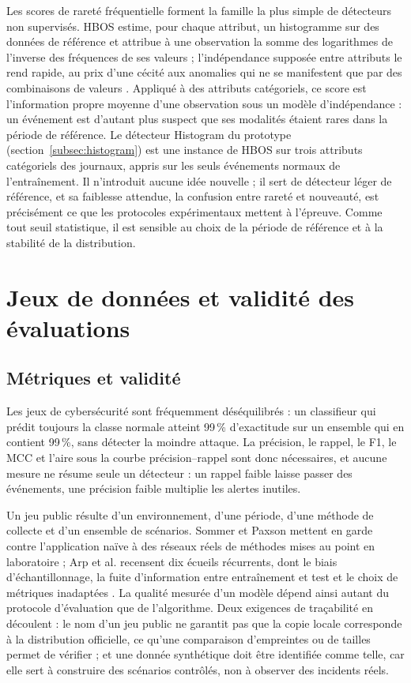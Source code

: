 Les scores de rareté fréquentielle forment la famille la plus simple de détecteurs non supervisés. HBOS estime, pour chaque attribut, un histogramme sur des données de référence et attribue à une observation la somme des logarithmes de l'inverse des fréquences de ses valeurs ; l'indépendance supposée entre attributs le rend rapide, au prix d'une cécité aux anomalies qui ne se manifestent que par des combinaisons de valeurs \cite{goldstein2012hbos}. Appliqué à des attributs catégoriels, ce score est l'information propre moyenne d'une observation sous un modèle d'indépendance : un événement est d'autant plus suspect que ses modalités étaient rares dans la période de référence. Le détecteur Histogram du prototype (section~\ref{subsec:histogram}) est une instance de HBOS sur trois attributs catégoriels des journaux, appris sur les seuls événements normaux de l'entraînement. Il n'introduit aucune idée nouvelle ; il sert de détecteur léger de référence, et sa faiblesse attendue, la confusion entre rareté et nouveauté, est précisément ce que les protocoles expérimentaux mettent à l'épreuve. Comme tout seuil statistique, il est sensible au choix de la période de référence et à la stabilité de la distribution.

\section{Jeux de données et validité des évaluations}

\subsection{Métriques et validité}

Les jeux de cybersécurité sont fréquemment déséquilibrés : un classifieur qui prédit toujours la classe normale atteint 99\,\% d'exactitude sur un ensemble qui en contient 99\,\%, sans détecter la moindre attaque. La précision, le rappel, le F1, le MCC et l'aire sous la courbe précision--rappel sont donc nécessaires, et aucune mesure ne résume seule un détecteur : un rappel faible laisse passer des événements, une précision faible multiplie les alertes inutiles.

Un jeu public résulte d'un environnement, d'une période, d'une méthode de collecte et d'un ensemble de scénarios. Sommer et Paxson mettent en garde contre l'application naïve à des réseaux réels de méthodes mises au point en laboratoire \cite{sommer2010outside} ; Arp et al. recensent dix écueils récurrents, dont le biais d'échantillonnage, la fuite d'information entre entraînement et test et le choix de métriques inadaptées \cite{arp2022dos}. La qualité mesurée d'un modèle dépend ainsi autant du protocole d'évaluation que de l'algorithme. Deux exigences de traçabilité en découlent : le nom d'un jeu public ne garantit pas que la copie locale corresponde à la distribution officielle, ce qu'une comparaison d'empreintes ou de tailles permet de vérifier ; et une donnée synthétique doit être identifiée comme telle, car elle sert à construire des scénarios contrôlés, non à observer des incidents réels.

